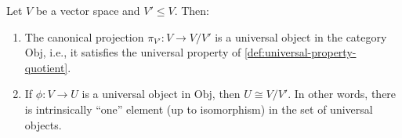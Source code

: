 \begin{theorem}\label{thm: universal-property-quotient}
Let \( V \) be a vector space and \( V' \leq V \). Then:

\begin{enumerate}
    \item The canonical projection \( \pi_{V'} : V \to V/V' \) is a universal object in the category \( \mathrm{Obj} \), i.e., it satisfies the universal property of \autoref{def:universal-property-quotient}.
    
    \item If \( \phi : V \to U \) is a universal object in \( \mathrm{Obj} \), then \( U \cong V/V' \). In other words, there is intrinsically “one” element (up to isomorphism) in the set of universal objects.
\end{enumerate}
\end{theorem}

